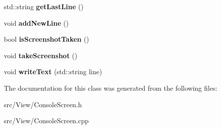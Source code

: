 \begin{DoxyCompactItemize}
\item 
std\+::string {\bfseries get\+Last\+Line} ()\hypertarget{classConsoleScreen_a70051b4511a76d81ba6483128a6d9658}{}\label{classConsoleScreen_a70051b4511a76d81ba6483128a6d9658}

\item 
void {\bfseries add\+New\+Line} ()\hypertarget{classConsoleScreen_a69265f0111b9fd6c0f0e65fbe0f70771}{}\label{classConsoleScreen_a69265f0111b9fd6c0f0e65fbe0f70771}

\item 
bool {\bfseries is\+Screenshot\+Taken} ()\hypertarget{classConsoleScreen_ad7bc53aee06514062a6c72e31e00ec1a}{}\label{classConsoleScreen_ad7bc53aee06514062a6c72e31e00ec1a}

\item 
void {\bfseries take\+Screenshot} ()\hypertarget{classConsoleScreen_af6b9e6d03d28cdad8031351efda023bb}{}\label{classConsoleScreen_af6b9e6d03d28cdad8031351efda023bb}

\item 
void {\bfseries write\+Text} (std\+::string line)\hypertarget{classConsoleScreen_ad58f19afabec8d5cbc23e88aa775b518}{}\label{classConsoleScreen_ad58f19afabec8d5cbc23e88aa775b518}

\end{DoxyCompactItemize}


The documentation for this class was generated from the following files\+:\begin{DoxyCompactItemize}
\item 
src/\+View/Console\+Screen.\+h\item 
src/\+View/Console\+Screen.\+cpp\end{DoxyCompactItemize}
